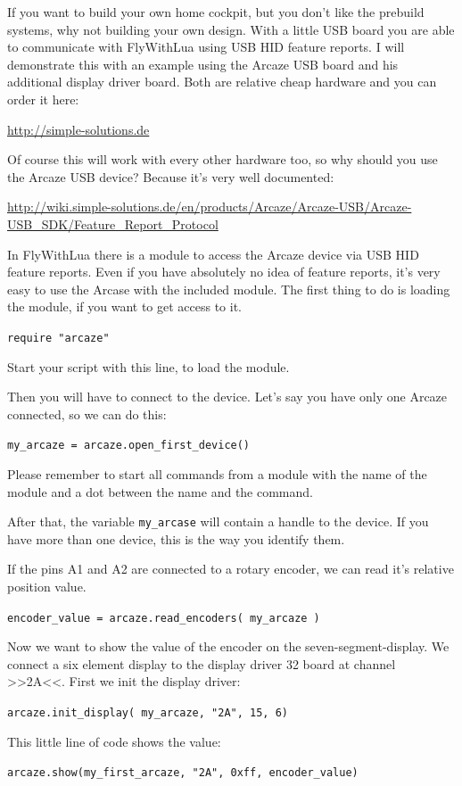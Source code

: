 \documentclass[11pt,parskip=half,a4paper]{scrartcl}
\begin{document}
If you want to build your own home cockpit, but you don't like the prebuild systems, why not building your own design. With a little USB board you are able to communicate with FlyWithLua using USB HID feature reports. I will demonstrate this with an example using the Arcaze USB board and his additional display driver board. Both are relative cheap hardware and you can order it here:

\url{http://simple-solutions.de}

Of course this will work with every other hardware too, so why should you use the Arcaze USB device? Because it's very well documented:

\url{http://wiki.simple-solutions.de/en/products/Arcaze/Arcaze-USB/Arcaze-USB_SDK/Feature_Report_Protocol}

In FlyWithLua there is a module to access the Arcaze device via USB HID feature reports. Even if you have absolutely no idea of feature reports, it's very easy to use the Arcase with the included module. The first thing to do is loading the module, if you want to get access to it.

\verb|require "arcaze"|
 
Start your script with this line, to load the module.

Then you will have to connect to the device. Let's say you have only one Arcaze connected, so we can do this:

\verb|my_arcaze = arcaze.open_first_device()|

Please remember to start all commands from a module with the name of the module and a dot between the name and the command.

After that, the variable \verb|my_arcase| will contain a handle to the device. If you have more than one device, this is the way you identify them.

If the pins A1 and A2 are connected to a rotary encoder, we can read it's relative position value.

\verb|encoder_value = arcaze.read_encoders( my_arcaze )|

Now we want to show the value of the encoder on the seven-segment-display. We connect a six element display to the display driver 32 board at channel >>2A<<. First we init the display driver:

\verb|arcaze.init_display( my_arcaze, "2A", 15, 6)|


This little line of code shows the value:

\verb|arcaze.show(my_first_arcaze, "2A", 0xff, encoder_value)|
\end{document}
